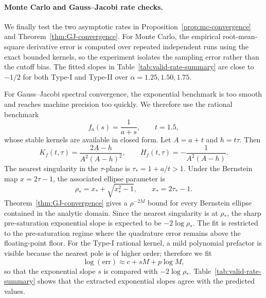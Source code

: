 \paragraph*{Monte Carlo and Gauss--Jacobi rate checks.}
We finally test the two asymptotic rates in Proposition~\ref{prop:mc-convergence} and Theorem~\ref{thm:GJ-convergence}.  For Monte Carlo, the empirical root-mean-square derivative error is computed over repeated independent runs using the exact bounded kernels, so the experiment isolates the sampling error rather than the cutoff bias.  The fitted slopes in Table~\ref{tab:valid-rate-summary} are close to $-1/2$ for both Type-I and Type-II over $\alpha=1.25,1.50,1.75$.

For Gauss--Jacobi spectral convergence, the exponential benchmark is too smooth and reaches machine precision too quickly.  We therefore use the rational benchmark
\begin{equation}
    f_a(s)=\frac{1}{a+s},\qquad t=1.5,
    \label{eq:valid-rational-benchmark}
\end{equation}
whose stable kernels are available in closed form.  Let $A=a+t$ and $h=t\tau$.  Then
\begin{equation}
    K_f(t,\tau)=\frac{2A-h}{A^2(A-h)^2},
    \qquad
    H_f(t,\tau)=-\frac{1}{A^2(A-h)}.
\end{equation}
The nearest singularity in the $\tau$-plane is $\tau_*=1+a/t>1$.  Under the Bernstein map $x=2\tau-1$, the associated ellipse parameter is
\begin{equation}
    \rho_*=x_*+\sqrt{x_*^2-1},
    \qquad x_*=2\tau_*-1.
\end{equation}
Theorem~\ref{thm:GJ-convergence} gives a $\rho^{-2M}$ bound for every Bernstein ellipse contained in the analytic domain.  Since the nearest singularity is at $\rho_*$, the sharp pre-saturation exponential slope is expected to be $-2\log\rho_*$.  The fit is restricted to the pre-saturation regime where the quadrature error remains above the floating-point floor.  For the Type-I rational kernel, a mild polynomial prefactor is visible because the nearest pole is of higher order; therefore we fit
\begin{equation}
    \log(\mathrm{err})\approx c+sM+p\log M,
\end{equation}
so that the exponential slope $s$ is compared with $-2\log\rho_*$.  Table~\ref{tab:valid-rate-summary} shows that the extracted exponential slopes agree with the predicted values.

